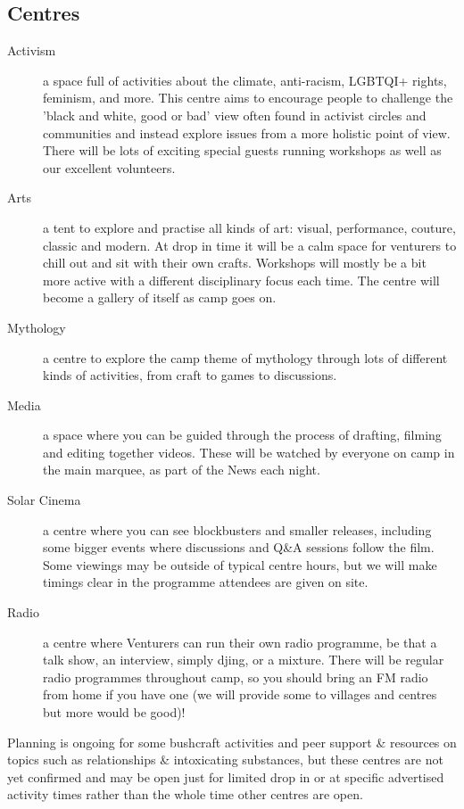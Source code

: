 \documentclass[a4paper, 11pt]{report}
\begin{document}
\subsection{Centres}
\begin{description}
    \item[Activism] a space full of activities about the climate, anti-racism, LGBTQI+ rights, feminism, and more. This centre aims to encourage people to challenge the 'black and white, good or bad' view often found in activist circles and communities and instead explore issues from a more holistic point of view. There will be lots of exciting special guests running workshops as well as our excellent volunteers.
    \item[Arts] a tent to explore and practise all kinds of art: visual, performance, couture, classic and modern. At drop in time it will be a calm space for venturers to chill out and sit with their own crafts. Workshops will mostly be a bit more active with a different disciplinary focus each time. The centre will become a gallery of itself as camp goes on.
    \item[Mythology] a centre to explore the camp theme of mythology through lots of  different kinds of activities, from craft to games to discussions.
    \item[Media] a space where you can be guided through the process of drafting, filming and editing together videos. These will be watched by everyone on camp in the main marquee, as part of the News each night.
    \item[Solar Cinema] a centre where you can see blockbusters and smaller releases, including some bigger events where discussions and Q\&A sessions follow the film. Some viewings may be outside of typical centre hours, but we will make timings clear in the programme attendees are given on site.
    \item[Radio] a centre where Venturers can run their own radio programme, be that a talk show, an interview, simply djing, or a mixture. There will be regular radio programmes throughout camp, so you should bring an FM radio from home if you have one (we will provide some to villages and centres but more would be good)!
\end{description}

Planning is ongoing for some bushcraft activities and peer support \& resources on topics such as relationships \& intoxicating substances, but these centres are not yet confirmed and may be open just for limited drop in or at specific advertised activity times rather than the whole time other centres are open.
\end{document}
